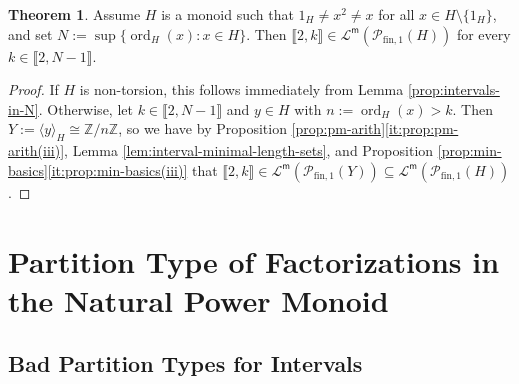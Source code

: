 \documentclass{report}
\newcommand{\NN}{\mathbb{N}}
\renewcommand{\P}{\mathcal{P}}
\newcommand{\ZZ}{\mathbb{Z}}
\newcommand{\gen}[1]{\langle #1 \rangle}
\newcommand{\llb}{\llbracket}
\newcommand{\rrb}{\rrbracket}
\newcommand{\fin}{\textrm{fin}}
\newcommand{\fun}{{\textrm{fin}, 1}}
\newcommand{\m}{{\mathsf{m}}}
\newcommand{\ord}{{\operatorname{ord}}}
\renewcommand{\:}{\text{:}}
\theoremstyle{definition}
\newtheorem{thm}[defn]{Theorem}
\begin{document}
\begin{thm}\label{th:interval-lengths}
	Assume $H$ is a monoid such that $1_H \neq x^2 \neq x$ for all $x\in H\setminus\{1_H\}$, and set $N := \sup\{\ord_H(x) : x\in H \}$.
	Then $\llb 2, k \rrb \in \mathscr{L}^\m(\P_\fun(H))$ for every $k \in \llb 2, N-1 \rrb$.
\end{thm}

\begin{proof}
	If $H$ is non-torsion, this follows immediately from Lemma \ref{prop:intervals-in-N}.
	Otherwise, let $k\in \llb 2, N-1 \rrb$ and $y\in H$ with $n := \ord_H(x) > k$.
	Then $Y :=\gen{y}_H \cong \ZZ/n\ZZ$, so we have by Proposition \ref{prop:pm-arith}\ref{it:prop:pm-arith(iii)}, Lemma \ref{lem:interval-minimal-length-sets}, and Proposition \ref{prop:min-basics}\ref{it:prop:min-basics(iii)} that
	$\llb 2, k \rrb \in \mathscr{L}^\m(\P_\fun(Y)) \subseteq \mathscr{L}^\m(\P_\fun(H))$.
\end{proof}




\chapter{Partition Type of Factorizations in the Natural Power Monoid} \label{ch:partitions}
\section{Bad Partition Types for Intervals} \label{sec:partitions}


\end{document}
